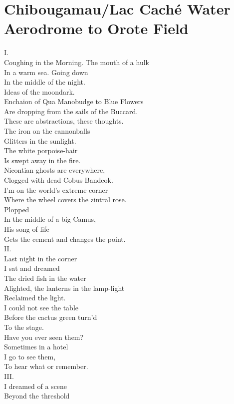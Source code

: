 \documentclass[smalldemyvopaper,11pt,twoside,onecolumn,openright,extrafontsizes]{memoir}
\newlength\drop
\begin{document}
\chapter{Chibougamau/Lac Caché Water Aerodrome to Orote Field}
I.
\\Coughing in the Morning. The mouth of a hulk
\\In a warm sea. Going down
\\In the middle of the night.
\\Ideas of the moondark.
\\Enchaion of Qua Manobudge to Blue Flowers
\\Are dropping from the sails of the Buccard.
\\These are abstractions, these thoughts.
\\The iron on the cannonballs
\\Glitters in the sunlight.
\\The white porpoise-hair
\\Is swept away in the fire.
\\Nicontian ghosts are everywhere,
\\Clogged with dead Cobus Bandeok.
\\I'm on the world's extreme corner
\\Where the wheel covers the zintral rose.
\\Plopped
\\In the middle of a big Camus,
\\His song of life
\\Gets the cement and changes the point.
\\II.
\\Last night in the corner
\\I sat and dreamed
\\The dried fish in the water
\\Alighted, the lanterns in the lamp-light
\\Reclaimed the light.
\\I could not see the table
\\Before the cactus green turn'd
\\To the stage.
\\Have you ever seen them?
\\Sometimes in a hotel
\\I go to see them,
\\To hear what or remember.
\\III.
\\I dreamed of a scene
\\Beyond the threshold
\end{document}
